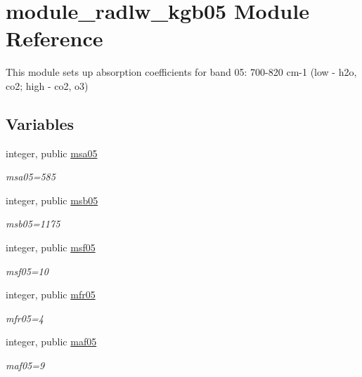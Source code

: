 \hypertarget{namespacemodule__radlw__kgb05}{}\section{module\+\_\+radlw\+\_\+kgb05 Module Reference}
\label{namespacemodule__radlw__kgb05}


This module sets up absorption coefficients for band 05\+: 700-\/820 cm-\/1 (low -\/ h2o, co2; high -\/ co2, o3)  


\subsection*{Variables}
\begin{DoxyCompactItemize}
\item 
\mbox{\label{namespacemodule__radlw__kgb05_a79c5177c6d0e56a69f4d1a0704879539}} 
integer, public \hyperlink{namespacemodule__radlw__kgb05_a79c5177c6d0e56a69f4d1a0704879539}{msa05}
\begin{DoxyCompactList}\small\item\em msa05=585 \end{DoxyCompactList}\item 
integer, public \hyperlink{group__module__radlw__kgbnn_ga0f3b6573bfe94c5a5968cda2dc8b1adf}{msb05}
\begin{DoxyCompactList}\small\item\em msb05=1175 \end{DoxyCompactList}\item 
integer, public \hyperlink{group__module__radlw__kgbnn_ga1c9a43b7011e7328fa62d3ecd29acc73}{msf05}
\begin{DoxyCompactList}\small\item\em msf05=10 \end{DoxyCompactList}\item 
integer, public \hyperlink{group__module__radlw__kgbnn_ga44f07da9a7f99377f7d331249c475b80}{mfr05}
\begin{DoxyCompactList}\small\item\em mfr05=4 \end{DoxyCompactList}\item 
integer, public \hyperlink{group__module__radlw__kgbnn_gaba904215976d7f4316b52c8f0cffe595}{maf05}
\begin{DoxyCompactList}\small\item\em maf05=9 \end{DoxyCompactList}\item 

\end{DoxyCompactItemize}
